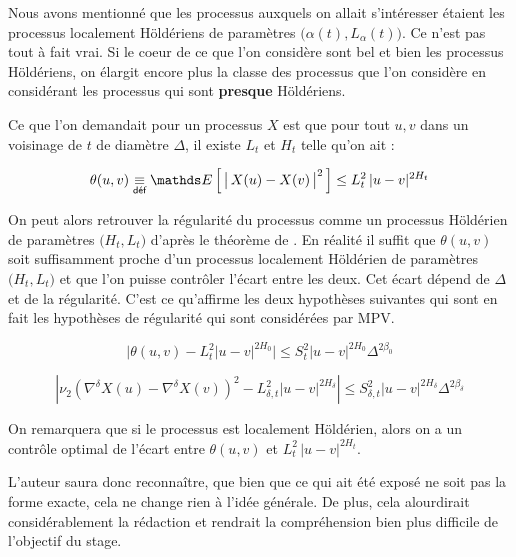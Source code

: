 
Nous avons mentionné que les processus auxquels on allait s'intéresser étaient les processus localement Höldériens de paramètres $\bigl(\alpha(t), L_\alpha(t)\bigr)$. Ce n'est pas tout à fait vrai. Si le coeur de ce que l'on considère sont bel et bien les processus Höldériens, on élargit encore plus la classe des processus que l'on considère en considérant les processus qui sont \textbf{presque} Höldériens.



Ce que l'on demandait pour un processus $X$ est que pour tout $u,v$ dans un voisinage de $t$ de diamètre $\Delta$, il existe  $L_t$ et $H_t$ telle qu'on ait  :

\begin{equation*}
	\theta(u,v) \isdef \esperance{ \bigl\vert \, X(u) - X(v) \, \bigr\vert^2 } \leq L_t^2 \, \vert u - v \vert^{2 H_t}
\end{equation*}

On peut alors retrouver la régularité du processus comme un processus Höldérien de paramètres $\bigl(H_t, L_t\bigr)$ d'après le théorème de . En réalité il suffit que $\theta(u,v)$ soit suffisamment proche d'un processus localement Höldérien de paramètres $\bigl(H_t, L_t\bigr)$ et que l'on puisse contrôler l'écart entre les deux. Cet écart dépend de $\Delta$ et de la régularité. C'est ce qu'affirme les deux hypothèses suivantes qui sont en fait les hypothèses de régularité qui sont considérées par MPV\cite{maissoro-SmoothnessFTSweakDep}.

\begin{equation*}
	\bigl\vert \theta(u,v)-L_{t}^{2}|u-v|^{2H_{0}}\bigr\vert\leq S_{t}^{2}|u-v|^{2H_{0}}\Delta^{2\beta_{0}}
\end{equation*}

\cite[H6]{maissoro-SmoothnessFTSweakDep}

\begin{equation*}
	\left|\nu_{2}\left(\nabla^{\delta}X(u)-\nabla^{\delta}X(v)\right)^{2}-L_{\delta,t}^{2}|u-v|^{2H_\delta}\right|\leq S_{\delta,t}^{2}|u-v|^{2H_\delta}\Delta^{2\beta_{\delta}}
\end{equation*}


\cite[D1-7]{maissoro-SmoothnessFTSweakDep}


\noindent On remarquera que si le processus est localement Höldérien, alors on a un contrôle optimal de l'écart entre $\theta(u,v)$ et $L_t^2 \, \vert u - v \vert^{2 H_t}$.

L'auteur saura donc reconnaître, que bien que ce qui ait été exposé ne soit pas la forme exacte, cela ne change rien à l'idée générale. De plus, cela alourdirait considérablement la rédaction et rendrait la compréhension bien plus difficile de l'objectif du stage.
